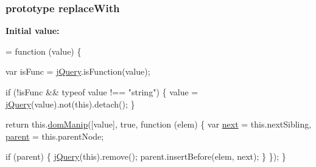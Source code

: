 \subsubsection[{\texorpdfstring{replace\+With}{replaceWith}}]{ {\bf prototype} replace\+With}\hypertarget{jquery-2_82_81-vsdoc_8js_adefc41a8d3d9f7f534df4b2171d70141}{}\label{jquery-2_82_81-vsdoc_8js_adefc41a8d3d9f7f534df4b2171d70141}
{\bfseries Initial value\+:}
\begin{DoxyCode}
= \textcolor{keyword}{function} (value) \{
        

        var isFunc = \hyperlink{jquery-2_82_81-vsdoc_8js_add5237586d970a38a81f990e8eb28c6c}{jQuery}.isFunction(value);

        
        
        \textcolor{keywordflow}{if} (!isFunc && typeof value !== \textcolor{stringliteral}{"string"}) \{
            value = \hyperlink{jquery-2_82_81-vsdoc_8js_add5237586d970a38a81f990e8eb28c6c}{jQuery}(value).not(\textcolor{keyword}{this}).detach();
        \}

        \textcolor{keywordflow}{return} this.\hyperlink{jquery-2_82_81-vsdoc_8js_a00a63bd312ef048290dc1755ccb8bae4}{domManip}([value], \textcolor{keyword}{true}, \textcolor{keyword}{function} (elem) \{
            var \hyperlink{jquery-2_82_81-vsdoc_8js_a61213ec31ab21de6b8fbe75332157524}{next} = this.nextSibling,
                \hyperlink{jquery-2_82_81-vsdoc_8js_aed9b5e7a755bcccb282f9b06c00a6822}{parent} = this.parentNode;

            \textcolor{keywordflow}{if} (parent) \{
                \hyperlink{jquery-2_82_81-vsdoc_8js_add5237586d970a38a81f990e8eb28c6c}{jQuery}(\textcolor{keyword}{this}).remove();
                parent.insertBefore(elem, next);
            \}
        \});
    \}
\end{DoxyCode}
